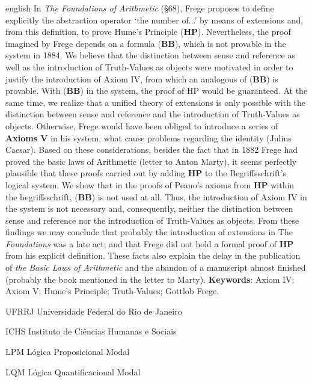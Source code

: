 \documentclass[12pt]{abntex2}
\begin{document}
\begin{resumo}[Abstract] 
\begin{otherlanguage*}{english}
In \textit{The Foundations of Arithmetic} (§68), Frege proposes to define explicitly the abstraction operator `the number of...' by means of extensions and, from this definition, to prove Hume's Principle (\textbf{HP}). Nevertheless, the proof imagined by Frege depends on a formula (\textbf{BB}), which is not provable in the system in 1884. We believe that the distinction between sense and reference as well as the introduction of Truth-Values as objects were motivated in order to justify the introduction of Axiom IV, from which an analogous of (\textbf{BB}) is provable. With (\textbf{BB}) in the system, the proof of HP would be guaranteed. At the same time, we realize that a unified theory of extensions is only possible with the distinction between sense and reference and the introduction of Truth-Values as objects. Otherwise, Frege would have been obliged to introduce a series of \textbf{Axioms V} in his system, what cause problems regarding the identity (Julius Caesar). Based on these considerations, besides the fact that in 1882 Frege had proved the basic laws of Arithmetic (letter to Anton Marty), it seems perfectly plausible that these proofs carried out by adding \textbf{HP} to the Begriffsschrift's logical system. We show that in the proofs of Peano's axioms from \textbf{HP} within the begriffsschrift, (\textbf{BB}) is not used at all. Thus, the introduction of Axiom IV in the system is not necessary and, consequently, neither the distinction between sense and reference nor the introduction of Truth-Values as objects. From these findings we may conclude that probably the introduction of extensions in The \textit{Foundations} was a late act; and that Frege did not hold a formal proof of \textbf{HP} from his explicit definition. These facts also explain the delay in the publication of \textit{the Basic Laws of Arithmetic} and the abandon of a manuscript almost finished (probably the book mentioned in the letter to Marty).
\vspace{\onelineskip} 
\noindent \textbf{Keywords}: Axiom IV; Axiom V; Hume's Principle; Truth-Values; Gottlob Frege. 
\end{otherlanguage*} 
\end{resumo} 
\begin{siglas} 
\item[UFRRJ] Universidade Federal do Rio de Janeiro
\item[ICHS] Instituto de Ciências Humanas e Sociais 
\item[LPM] Lógica Proposicional Modal 
\item[LQM] Lógica Quantificacional Modal 
\end{siglas}
\tableofcontents* %
\end{document}
